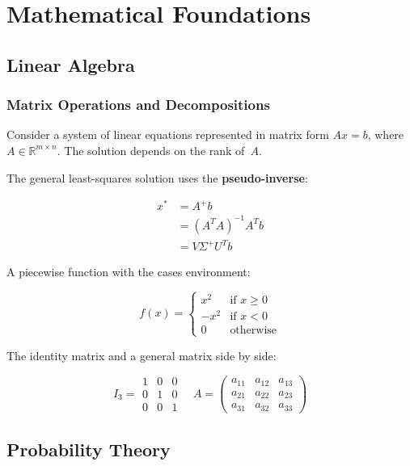 \section{Mathematical Foundations}

\subsection{Linear Algebra}

\subsubsection{Matrix Operations and Decompositions}

Consider a system of linear equations represented in matrix form $Ax = b$, where
$A \in \mathbb{R}^{m \times n}$. The solution depends on the rank of~$A$.

The general least-squares solution uses the \textbf{pseudo-inverse}:

$$\begin{align}
x^* &= A^+ b \\
    &= (A^T A)^{-1} A^T b \\
    &= V \Sigma^+ U^T b
\end{align}$$

A piecewise function with the cases environment:

$$f(x) = \begin{cases}
x^2 & \text{if } x \geq 0 \\
-x^2 & \text{if } x < 0 \\
0 & \text{otherwise}
\end{cases}$$

The identity matrix and a general matrix side by side:

$$I_3 = \begin{matrix}
1 & 0 & 0 \\
0 & 1 & 0 \\
0 & 0 & 1
\end{matrix}
\quad
A = \begin{pmatrix}
a_{11} & a_{12} & a_{13} \\
a_{21} & a_{22} & a_{23} \\
a_{31} & a_{32} & a_{33}
\end{pmatrix}$$

\subsection{Probability Theory}

